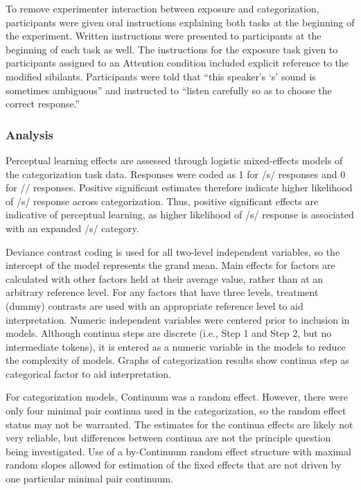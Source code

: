 To remove experimenter interaction between exposure and categorization, participants were given oral instructions explaining both tasks at the beginning of the experiment.
Written instructions were presented to participants at the beginning of each task as well.
The instructions for the exposure task given to participants assigned to an Attention condition included explicit reference to the modified sibilants.
Participants were told that ``this speaker's `s' sound is sometimes ambiguous'' and instructed to ``listen carefully so as to choose the correct response.''

\subsubsection{Analysis}

Perceptual learning effects are assessed through logistic mixed-effects models of the categorization task data.
Responses were coded as 1 for /s/ responses and 0 for /\textesh/ responses.
Positive significant estimates therefore indicate higher likelihood of /s/ response across categorization.
Thus, positive significant effects are indicative of perceptual learning, as higher likelihood of /s/ response is associated with an expanded /s/ category.

Deviance contrast coding is used for all two-level independent variables, so the intercept of the model represents the grand mean.
Main effects for factors are calculated with other factors held at their average value, rather than at an arbitrary reference level.
For any factors that have three levels, treatment (dummy) contrasts are used with an appropriate reference level to aid interpretation.
Numeric independent variables were centered prior to inclusion in models.
Although continua steps are discrete (i.e., Step 1 and Step 2, but no intermediate tokens), it is entered as a numeric variable in the models to reduce the complexity of models.
Graphs of categorization results show continua step as categorical factor to aid interpretation.

For categorization models, Continuum was a random effect.
However, there were only four minimal pair continua used in the categorization, so the random effect status may not be warranted.
The estimates for the continua effects are likely not very reliable, but differences between continua are not the principle question being investigated.
Use of a by-Continuum random effect structure with maximal random slopes allowed for estimation of the fixed effects that are not driven by one particular minimal pair continuum.

